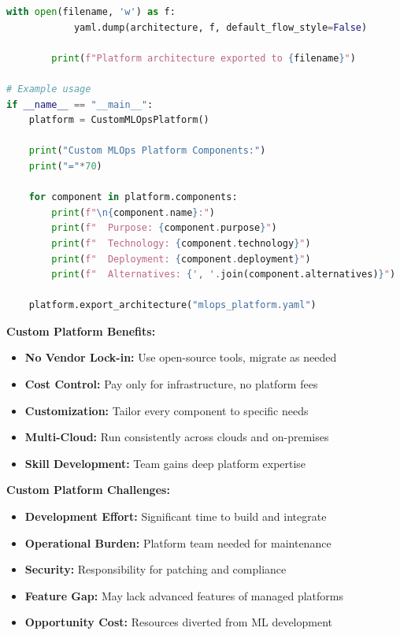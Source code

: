 \begin{lstlisting}[language=Python, caption=Minimal Custom MLOps Platform Design]
        with open(filename, 'w') as f:
            yaml.dump(architecture, f, default_flow_style=False)

        print(f"Platform architecture exported to {filename}")

# Example usage
if __name__ == "__main__":
    platform = CustomMLOpsPlatform()

    print("Custom MLOps Platform Components:")
    print("="*70)

    for component in platform.components:
        print(f"\n{component.name}:")
        print(f"  Purpose: {component.purpose}")
        print(f"  Technology: {component.technology}")
        print(f"  Deployment: {component.deployment}")
        print(f"  Alternatives: {', '.join(component.alternatives)}")

    platform.export_architecture("mlops_platform.yaml")
\end{lstlisting}

\textbf{Custom Platform Benefits:}

\begin{itemize}
    \item \textbf{No Vendor Lock-in:} Use open-source tools, migrate as needed
    \item \textbf{Cost Control:} Pay only for infrastructure, no platform fees
    \item \textbf{Customization:} Tailor every component to specific needs
    \item \textbf{Multi-Cloud:} Run consistently across clouds and on-premises
    \item \textbf{Skill Development:} Team gains deep platform expertise
\end{itemize}

\textbf{Custom Platform Challenges:}

\begin{itemize}
    \item \textbf{Development Effort:} Significant time to build and integrate
    \item \textbf{Operational Burden:} Platform team needed for maintenance
    \item \textbf{Security:} Responsibility for patching and compliance
    \item \textbf{Feature Gap:} May lack advanced features of managed platforms
    \item \textbf{Opportunity Cost:} Resources diverted from ML development
\end{itemize}

